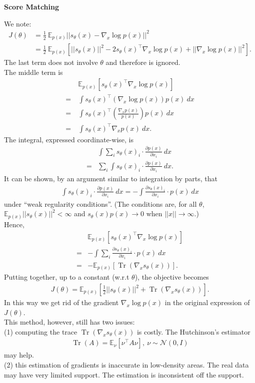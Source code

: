 \documentclass[12pt,oneside]{article}
\newcommand{\norm}[1]{\left|\left|#1\right|\right|}
\newcommand{\ra}[0]{\rightarrow}
\newcommand{\CN}[0]{\mathcal{N}}
\newcommand{\BE}[0]{\mathbb{E}}
\newcommand{\ali}[1]{\begin{align*}#1\end{align*}}
\DeclareMathOperator{\Tr}{Tr}
\theoremstyle{plain}
\theoremstyle{remark}
\begin{document}
{\bf Score Matching\\}

We note:
\ali{J(\theta) &= \frac{1}{2} \ \BE_{p(x)}  \norm{s_\theta(x) - \nabla_x \log p(x)}^2 \\
               &= \frac{1}{2} \ \BE_{p(x)} \left[ \norm{s_\theta(x)}^2 - 2 s_\theta(x)^\top \nabla_x \log p(x) + \norm{\nabla_x \log p(x)}^2 \right].}
The last term does not involve $\theta$ and therefore is ignored.\\
The middle term is
\ali{&\BE_{p(x)} \left[ s_\theta(x)^\top \nabla_x \log p(x) \right] \\
     = \ &\int s_\theta(x)^\top (\nabla_x \log p(x)) p(x) \ dx \\
     = \ &\int s_\theta(x)^\top \left(\frac{\nabla_x p(x)}{p(x)}\right) p(x) \ dx \\
     = \ &\int s_\theta(x)^\top \nabla_x p(x) \ dx. } 
The integral, expressed coordinate-wise, is
\ali{&\int \sum_i s_\theta(x)_i \cdot \frac{\partial p(x)}{\partial x_i} \ dx \\
   = &\sum_i \int s_\theta(x)_i \cdot \frac{\partial p(x)}{\partial x_i} \ dx.}
It can be shown, by an argument similar to integration by parts, that 
\ali{\int s_\theta(x)_i \cdot \frac{\partial p(x)}{\partial x_i} \ dx = - \int \frac{\partial s_\theta(x)_i}{\partial x_i} \cdot p(x) \ dx}
under ``weak regularity conditions''. (The conditions are, for all $\theta$, $\BE_{p(x)} \norm{s_\theta(x)}^2 < \infty$ and $s_\theta(x)p(x) \ra 0$ when $\norm{x} \ra \infty$.)\\
Hence, 
\ali{&\BE_{p(x)} \left[ s_\theta(x)^\top \nabla_x \log p(x) \right] \\
   = & - \int \sum_i \frac{\partial s_\theta(x)_i}{\partial x_i} \cdot p(x) \ dx \\
   = & - \BE_{p(x)} \left[ \Tr(\nabla_x s_\theta(x)) \right].}
Putting together, up to a constant (w.r.t $\theta$), the objective becomes
\ali{J(\theta) = \BE_{p(x)} \left[ \frac{1}{2} \norm{s_\theta(x)}^2 + \Tr(\nabla_x s_\theta(x)) \right].} 
In this way we get rid of the gradient $\nabla_x \log p(x)$ in the original expression of $J(\theta)$.\\
This method, however, still has two issues: \\
(1) computing the trace $\Tr(\nabla_x s_\theta(x))$ is costly. The Hutchinson's estimator
\ali{ \Tr(A) = \BE_\nu \left[ \nu^\top A \nu \right], \ \nu \sim \CN(0, I)}
may help.\\
(2) this estimation of gradients is inaccurate in low-density areas. The real data may have very limited support. The estimation is inconsistent off the support.\\
\end{document}
